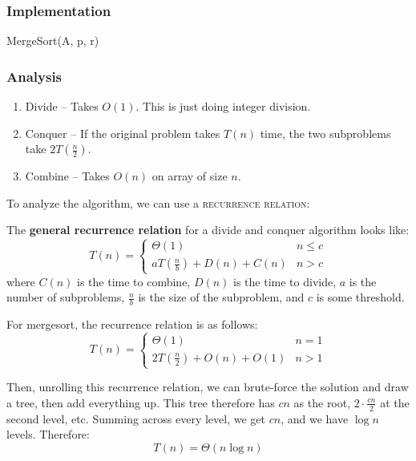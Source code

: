 \documentclass[11pt]{article}
\begin{document}
\subsubsection{Implementation}
\begin{algorithm}[H]
\caption{MergeSort(A, p, r)}
\end{algorithm}

\subsubsection{Analysis}
\begin{enumerate}
    \item Divide -- Takes $O(1)$. This is just doing integer division.
    \item Conquer -- If the original problem takes $T(n)$ time, the two subproblems take $2T(\frac{n}{2})$.
    \item Combine -- Takes $O(n)$ on array of size $n$.
\end{enumerate}

To analyze the algorithm, we can use a \textsc{recurrence relation}:
\begin{tcolorbox}
The \textbf{general recurrence relation} for a divide and conquer algorithm looks like:
$$ T(n) = \left\{ \begin{array}{cc}
    \Theta(1) & n \leq c \\
    aT(\frac{n}{b}) + D(n) + C(n) & n > c
\end{array}\right.$$
where $C(n)$ is the time to combine, $D(n)$ is the time to divide, $a$ is the number of subproblems, $\frac{n}{b}$ is the size of the subproblem, and $c$ is some threshold.
\end{tcolorbox}
For mergesort, the recurrence relation is as follows:
$$ T(n) = \left\{ \begin{array}{cc}
    \Theta(1) & n = 1 \\
    2T(\frac{n}{2}) + O(n) + O(1) & n > 1
\end{array}\right.$$

Then, unrolling this recurrence relation, we can brute-force the solution and draw a tree, then add everything up. This tree therefore has $cn$ as the root, $2 \cdot \frac{cn}{2}$ at the second level, etc. Summing across every level, we get $cn$, and we have $\log n$ levels. Therefore:
$$ T(n) = \Theta(n \log n)$$
\end{document}
